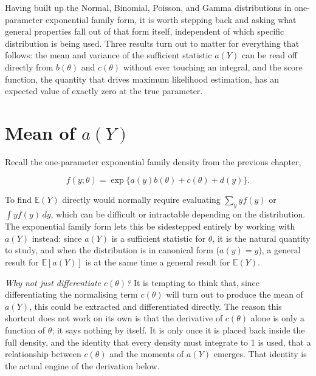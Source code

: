 \Exploration
\tbc

\Cognition

Having built up the Normal, Binomial, Poisson, and Gamma distributions in one-parameter exponential family form, it is worth stepping back and asking what general properties fall out of that form itself, independent of which specific distribution is being used. Three results turn out to matter for everything that follows: the mean and variance of the sufficient statistic $a(Y)$ can be read off directly from $b(\theta)$ and $c(\theta)$ without ever touching an integral, and the score function, the quantity that drives maximum likelihood estimation, has an expected value of exactly zero at the true parameter.

\section{Mean of \texorpdfstring{$a(Y)$}{a(Y)}}
Recall the one-parameter exponential family density from the previous chapter,
\begin{mathbox}
\[
f(y;\theta) = \exp\{a(y)b(\theta)+c(\theta)+d(y)\}.
\]
\end{mathbox}
To find $\mathbb{E}(Y)$ directly would normally require evaluating $\sum_y y f(y)$ or $\int y f(y)\,dy$, which can be difficult or intractable depending on the distribution. The exponential family form lets this be sidestepped entirely by working with $a(Y)$ instead: since $a(Y)$ is a sufficient statistic for $\theta$, it is the natural quantity to study, and when the distribution is in canonical form ($a(y)=y$), a general result for $\mathbb{E}[a(Y)]$ is at the same time a general result for $\mathbb{E}(Y)$.

\textit{Why not just differentiate $c(\theta)$?} It is tempting to think that, since differentiating the normalising term $c(\theta)$ will turn out to produce the mean of $a(Y)$, this could be extracted and differentiated directly. The reason this shortcut does not work on its own is that the derivative of $c(\theta)$ alone is only a function of $\theta$; it says nothing by itself. It is only once it is placed back inside the full density, and the identity that every density must integrate to 1 is used, that a relationship between $c(\theta)$ and the moments of $a(Y)$ emerges. That identity is the actual engine of the derivation below.

